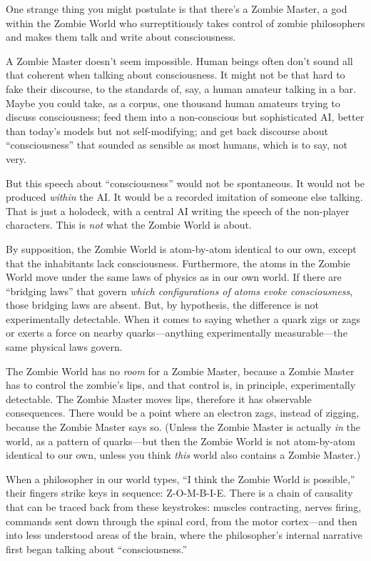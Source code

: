 {
 One strange thing you might postulate is that
there's a Zombie Master, a god within the Zombie World
who surreptitiously takes control of zombie philosophers and makes them
talk and write about consciousness.}

{
 A Zombie Master doesn't seem impossible. Human
beings often don't sound all that coherent when talking
about consciousness. It might not be that hard to fake their discourse,
to the standards of, say, a human amateur talking in a bar. Maybe you
could take, as a corpus, one thousand human amateurs trying to discuss
consciousness; feed them into a non-conscious but sophisticated AI,
better than today's models but not self-modifying; and
get back discourse about
``consciousness'' that sounded as
sensible as most humans, which is to say, not very.}

{
 But this speech about
``consciousness'' would not be
spontaneous. It would not be produced \textit{within} the AI. It would
be a recorded imitation of someone else talking. That is just a
holodeck, with a central AI writing the speech of the non-player
characters. This is \textit{not} what the Zombie World is about.}

{
 By supposition, the Zombie World is atom-by-atom identical to our
own, except that the inhabitants lack consciousness. Furthermore, the
atoms in the Zombie World move under the same laws of physics as in our
own world. If there are ``bridging
laws'' that govern \textit{which configurations of
atoms evoke consciousness}, those bridging laws are absent. But, by
hypothesis, the difference is not experimentally detectable. When it
comes to saying whether a quark zigs or zags or exerts a force on
nearby quarks---anything experimentally measurable---the same physical
laws govern.}

{
 The Zombie World has no \textit{room} for a Zombie Master, because
a Zombie Master has to control the zombie's lips, and
that control is, in principle, experimentally detectable. The Zombie
Master moves lips, therefore it has observable consequences. There
would be a point where an electron zags, instead of zigging, because
the Zombie Master says so. (Unless the Zombie Master is actually
\textit{in} the world, as a pattern of quarks---but then the Zombie
World is not atom-by-atom identical to our own, unless you think
\textit{this} world also contains a Zombie Master.)}

{
 When a philosopher in our world types, ``I think
the Zombie World is possible,'' their fingers strike
keys in sequence: Z-O-M-B-I-E. There is a chain of causality that can
be traced back from these keystrokes: muscles contracting, nerves
firing, commands sent down through the spinal cord, from the motor
cortex---and then into less understood areas of the brain, where the
philosopher's internal narrative first began talking
about ``consciousness.''}

